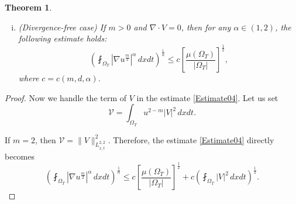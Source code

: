 \documentclass{amsart}
\newtheorem{theorem}[defn]{Theorem}
\numberwithin{equation}{section}
\begin{document}
\begin{theorem}
\begin{enumerate}[(i)]
 \smallskip

 \item (Divergence-free case) If $m > 0$ and $\nabla \cdot V = 0$, then for any $\alpha \in (1,2)$, the following estimate holds: 
     \begin{equation}\label{E_V_divfree}
	  \left(\fint_{\Omega_T} \left|\nabla u^{\frac{m}{2}}\right|^{\alpha} \,dxdt\right)^{\frac{1}{\alpha}}
  \leq c\left[ \frac{\mu(\Omega_{T})}{|\Omega_T|}\right]^{\frac{1}{2}},
   \end{equation}
   where $c=c(m,d,\alpha)$.
   \end{enumerate}
\end{theorem}


\begin{proof} 
Now we handle the term of $V$ in the estimate \eqref{Estimate04}. Let us set
    \[
   \mathcal{V}= \int_{\Omega_T} u^{2-m} |V|^2 \,dxdt.
   \]

If $m=2$, then $\mathcal{V}= \|V\|^{2}_{L_{x,t}^{2,2}}$. Therefore, the estimate \eqref{Estimate04} directly becomes 
\begin{equation}\label{E_V_22}
\left(\fint_{\Omega_T} \left|\nabla u^{\frac{m}{2}}\right|^{\alpha} \,dxdt\right)^{\frac{1}{\alpha}}
\le c \left[ \frac{\mu(\Omega_{T})}{|\Omega_T|}\right]^{\frac{1}{2}}+ c \left(\fint_{\Omega_T} |V|^2 \,dxdt\right)^{\frac{1}{2}}.
\end{equation}


\end{proof}
\end{document}
